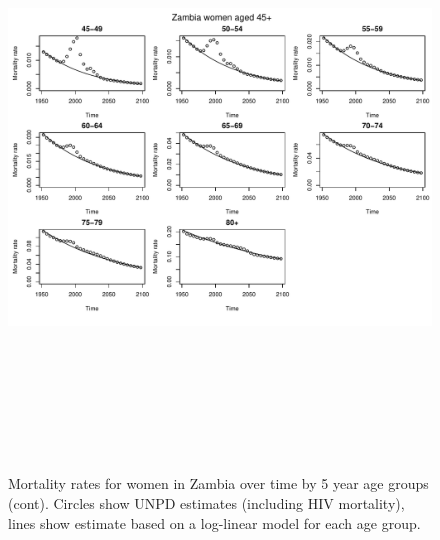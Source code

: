 \documentclass{article}
\begin{document}
\begin{figure}
\includegraphics[width=16cm,height=16cm]{EstimatingRatesFromUNPD-MortalityZamWomen2} 

\caption{Mortality rates for women in Zambia over time by 5 year age groups (cont). Circles show UNPD estimates (including HIV mortality), lines show estimate based on a log-linear model for each age group.}
\label{MortalitySAmen1}
\end{figure}


\clearpage
\end{document}
